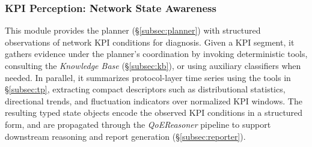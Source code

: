 \documentclass[sigconf,10pt]{acmart} %
\begin{document}
\subsubsection{KPI Perception: Network State Awareness}
\label{subsec:kpi-perception}

This module provides the planner (\S\ref{subsec:planner}) with structured observations of network KPI conditions for diagnosis. Given a KPI segment, it gathers evidence under the planner’s coordination by invoking deterministic tools, consulting the \emph{Knowledge Base} (\S\ref{subsec:kb}), or using auxiliary classifiers when needed. In parallel, it summarizes protocol-layer time series using the tools in \S\ref{subsec:tp}, extracting compact descriptors such as distributional statistics, directional trends, and fluctuation indicators over normalized KPI windows. The resulting typed state objects encode the observed KPI conditions in a structured form, and are propagated through the \textit{QoEReasoner} pipeline to support downstream reasoning and report generation (\S\ref{subsec:reporter}).
\end{document}
